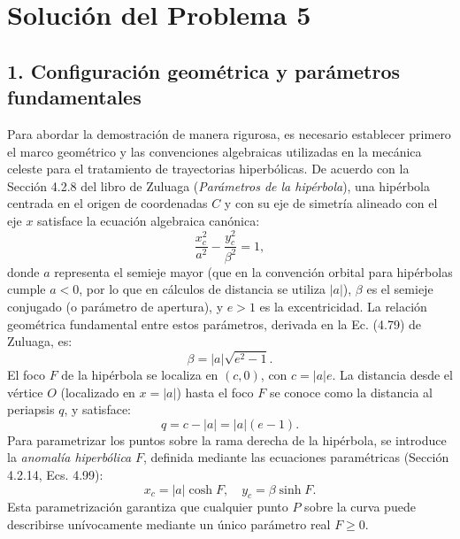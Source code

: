 \documentclass[12pt, a4paper]{article}
\begin{document}
\section*{Solución del Problema 5}

\subsection*{1. Configuración geométrica y parámetros fundamentales}
Para abordar la demostración de manera rigurosa, es necesario establecer primero el marco geométrico y las convenciones algebraicas utilizadas en la mecánica celeste para el tratamiento de trayectorias hiperbólicas. De acuerdo con la Sección 4.2.8 del libro de Zuluaga (\textit{Parámetros de la hipérbola}), una hipérbola centrada en el origen de coordenadas $C$ y con su eje de simetría alineado con el eje $x$ satisface la ecuación algebraica canónica:
$$
\frac{x_c^2}{a^2} - \frac{y_c^2}{\beta^2} = 1,
$$
donde $a$ representa el semieje mayor (que en la convención orbital para hipérbolas cumple $a < 0$, por lo que en cálculos de distancia se utiliza $|a|$), $\beta$ es el semieje conjugado (o parámetro de apertura), y $e > 1$ es la excentricidad. La relación geométrica fundamental entre estos parámetros, derivada en la Ec. (4.79) de Zuluaga, es:
$$
\beta = |a|\sqrt{e^2 - 1}.
$$
El foco $F$ de la hipérbola se localiza en $(c, 0)$, con $c = |a|e$. La distancia desde el vértice $O$ (localizado en $x = |a|$) hasta el foco $F$ se conoce como la distancia al periapsis $q$, y satisface:
$$
q = c - |a| = |a|(e - 1).
$$
Para parametrizar los puntos sobre la rama derecha de la hipérbola, se introduce la \textit{anomalía hiperbólica} $F$, definida mediante las ecuaciones paramétricas (Sección 4.2.14, Ecs. 4.99):
$$
x_c = |a|\cosh F, \quad y_c = \beta\sinh F.
$$
Esta parametrización garantiza que cualquier punto $P$ sobre la curva puede describirse unívocamente mediante un único parámetro real $F \geq 0$.
\end{document}
